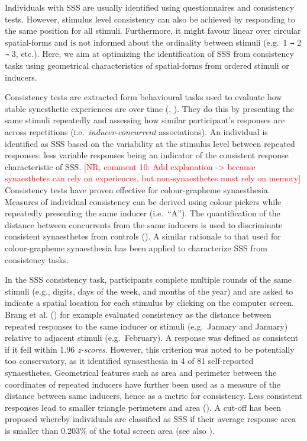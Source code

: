 \documentclass[
  man,
  longtable,
  a4paper,
  nolmodern,
  notxfonts,
  notimes,
  colorlinks=true,linkcolor=blue,citecolor=blue,urlcolor=blue]{apa7}
\begin{document}
Individuals with SSS are usually identified using questionnaires and
consistency tests. However, stimulus level consistency can also be
achieved by responding to the same position for all stimuli.
Furthermore, it might favour linear over circular spatial-forms and is
not informed about the ordinality between stimuli (e.g.~1 \texttt{→} 2
\texttt{→} 3, etc.). Here, we aim at optimizing the identification of
SSS from consistency tasks using geometrical characteristics of
spatial-forms from ordered stimuli or inducers.

Consistency tests are extracted form behavioural tasks used to evaluate
how stable synesthetic experiences are over time
(,
). They do this by presenting the same
stimuli repeatedly and assessing how similar participant's responses are
across repetitions (i.e.~\emph{inducer}-\emph{concurrent} associations).
An individual is identified as SSS based on the variability at the
stimulus level between repeated responses: less variable responses being
an indicator of the consistent response characteristic of SSS.
\textcolor{red}{[NR, comment 10: Add explanation -> because synaesthetes can rely on experiences, but non-synaesthetes must rely on memory]}
Consistency tests have proven effective for colour-grapheme
synaesthesia. Measures of individual consistency can be derived using
colour pickers while repeatedly presenting the same inducer
(i.e.~``A''). The quantification of the distance between concurrents
from the same inducers is used to discriminate consistent synaesthetes
from controls (). A
similar rationale to that used for colour-grapheme synaesthesia has been
applied to characterize SSS from consistency tasks.

In the SSS consistency task, participants complete multiple rounds of
the same stimuli (e.g., digits, days of the week, and months of the
year) and are asked to indicate a spatial location for each stimulus by
clicking on the computer screen. Brang et al.
() for example evaluated consistency as
the distance between repeated responses to the same inducer or stimuli
(e.g.~January and January) relative to adjacent stimuli (e.g.~February).
A response was defined as consistent if it fell within 1.96
\emph{z-scores}. However, this criterion was noted to be potentially too
conservatory, as it identified synaesthesia in 4 of 81 self-reported
synaesthetes. Geometrical features such as area and perimeter between
the coordinates of repeated inducers have further been used as a measure
of the distance between same inducers, hence as a metric for
consistency. Less consistent responses lead to smaller triangle
perimeters and area (). A
cut-off has been proposed whereby individuals are classified as SSS if
their average response area is smaller than 0.203\% of the total screen
area (see also ).
\end{document}
